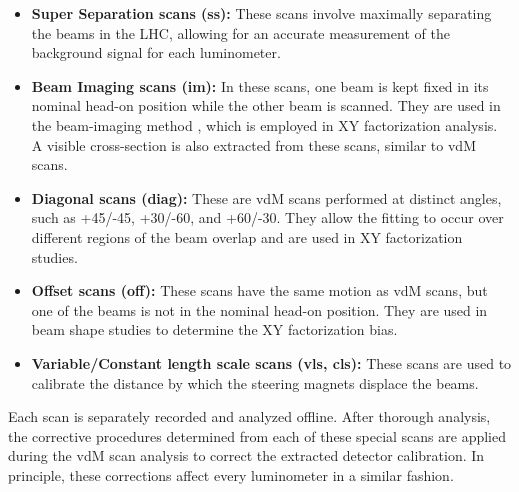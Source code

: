 \begin{itemize}
    \item \textbf{Super Separation scans (ss):} These scans involve maximally separating the beams in the LHC, allowing for an accurate measurement of the background signal for each luminometer.
    \item \textbf{Beam Imaging scans (im):} In these scans, one beam is kept fixed in its nominal head-on position while the other beam is scanned. They are used in the beam-imaging method \cite{Klute_2017}, which is employed in XY factorization analysis. A visible cross-section is also extracted from these scans, similar to vdM scans.
    \item \textbf{Diagonal scans (diag):} These are vdM scans performed at distinct angles, such as +45/-45, +30/-60, and +60/-30. They allow the fitting to occur over different regions of the beam overlap and are used in XY factorization studies.
    \item \textbf{Offset scans (off):} These scans have the same motion as vdM scans, but one of the beams is not in the nominal head-on position. They are used in beam shape studies to determine the XY factorization bias.
    \item \textbf{Variable/Constant length scale scans (vls, cls):} These scans are used to calibrate the distance by which the steering magnets displace the beams.
\end{itemize}

Each scan is separately recorded and analyzed offline. After thorough analysis, the corrective procedures determined from each of these special scans are applied during the vdM scan analysis to correct the extracted detector calibration. In principle, these corrections affect every luminometer in a similar fashion.
